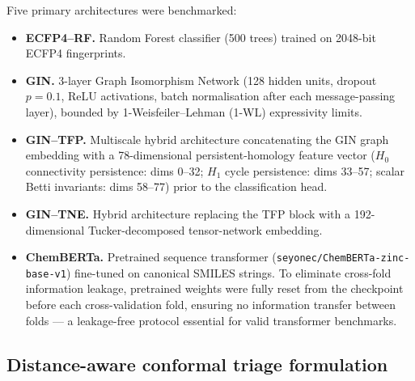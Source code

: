 \documentclass[11pt,a4paper]{article}
\begin{document}
Five primary architectures were benchmarked:
\begin{itemize}[leftmargin=*]
    \item \textbf{ECFP4--RF.} Random Forest classifier (\num{500} trees) trained on \num{2048}-bit ECFP4 fingerprints.
    \item \textbf{GIN.} \num{3}-layer Graph Isomorphism Network (\num{128} hidden units, dropout $p=\num{0.1}$, ReLU activations, batch normalisation after each message-passing layer), bounded by 1-Weisfeiler--Lehman (1-WL) expressivity limits.
    \item \textbf{GIN--TFP.} Multiscale hybrid architecture concatenating the GIN graph embedding with a \num{78}-dimensional persistent-homology feature vector ($H_0$ connectivity persistence: dims \numrange{0}{32}; $H_1$ cycle persistence: dims \numrange{33}{57}; scalar Betti invariants: dims \numrange{58}{77}) prior to the classification head.
    \item \textbf{GIN--TNE.} Hybrid architecture replacing the TFP block with a \num{192}-dimensional Tucker-decomposed tensor-network embedding.
    \item \textbf{ChemBERTa.} Pretrained sequence transformer (\texttt{seyonec/ChemBERTa-zinc-base-v1}) fine-tuned on canonical SMILES strings. To eliminate cross-fold information leakage, pretrained weights were fully reset from the checkpoint before each cross-validation fold, ensuring no information transfer between folds --- a leakage-free protocol essential for valid transformer benchmarks.
\end{itemize}

\subsection{Distance-aware conformal triage formulation}
\end{document}
